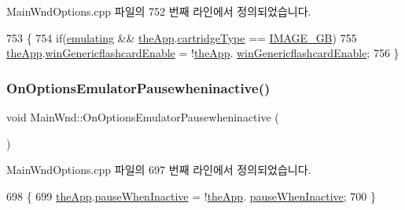 Main\+Wnd\+Options.\+cpp 파일의 752 번째 라인에서 정의되었습니다.


\begin{DoxyCode}
753 \{
754   \textcolor{keywordflow}{if}(\mbox{\hyperlink{_main_wnd_options_8cpp_af9cc36078b1b311753963297ae7f2a74}{emulating}} && \mbox{\hyperlink{_v_b_a_8cpp_a8095a9d06b37a7efe3723f3218ad8fb3}{theApp}}.\mbox{\hyperlink{class_v_b_a_af300759fcbc7eeb00ce73f956fc5ddb7}{cartridgeType}} == \mbox{\hyperlink{_util_8h_aef8b88d56fdf9a25f990a68d80c014d8a72281d361ec2edaf47e3a93b136dd4ed}{IMAGE\_GB}})
755   \mbox{\hyperlink{_v_b_a_8cpp_a8095a9d06b37a7efe3723f3218ad8fb3}{theApp}}.\mbox{\hyperlink{class_v_b_a_ac51ec97cd7b489be24edc77f346e5de7}{winGenericflashcardEnable}} = !\mbox{\hyperlink{_v_b_a_8cpp_a8095a9d06b37a7efe3723f3218ad8fb3}{theApp}}.
      \mbox{\hyperlink{class_v_b_a_ac51ec97cd7b489be24edc77f346e5de7}{winGenericflashcardEnable}};
756 \}
\end{DoxyCode}
\mbox{\label{class_main_wnd_a0def4f8d03a9034f1644571a029cd062}} 
\subsubsection{\texorpdfstring{On\+Options\+Emulator\+Pausewheninactive()}{OnOptionsEmulatorPausewheninactive()}}
{\footnotesize\ttfamily void Main\+Wnd\+::\+On\+Options\+Emulator\+Pausewheninactive (\begin{DoxyParamCaption}{ }\end{DoxyParamCaption})\hspace{0.3cm}{\ttfamily [protected]}}



Main\+Wnd\+Options.\+cpp 파일의 697 번째 라인에서 정의되었습니다.


\begin{DoxyCode}
698 \{
699   \mbox{\hyperlink{_v_b_a_8cpp_a8095a9d06b37a7efe3723f3218ad8fb3}{theApp}}.\mbox{\hyperlink{class_v_b_a_a77e9763291376839d4c1e5eff00604b5}{pauseWhenInactive}} = !\mbox{\hyperlink{_v_b_a_8cpp_a8095a9d06b37a7efe3723f3218ad8fb3}{theApp}}.
      \mbox{\hyperlink{class_v_b_a_a77e9763291376839d4c1e5eff00604b5}{pauseWhenInactive}};
700 \}
\end{DoxyCode}
\mbox{\label{class_main_wnd_a7b6bec3286f6833167cd6e6adfcf39e0}} 
